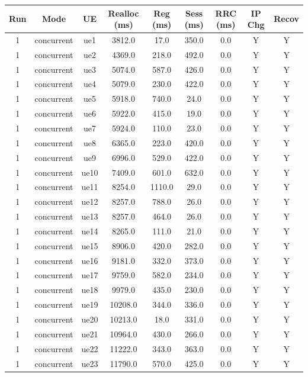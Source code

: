 \begin{table}[ht]
\centering
\begin{tabular}{|c|c|c|c|c|c|c|c|c|}
\hline
Run & Mode & UE & Realloc (ms) & Reg (ms) & Sess (ms) & RRC (ms) & IP Chg & Recov \\
\hline
1 & concurrent & ue1 & 3812.0 & 17.0 & 350.0 & 0.0 & Y & Y \\
1 & concurrent & ue2 & 4369.0 & 218.0 & 492.0 & 0.0 & Y & Y \\
1 & concurrent & ue3 & 5074.0 & 587.0 & 426.0 & 0.0 & Y & Y \\
1 & concurrent & ue4 & 5079.0 & 230.0 & 422.0 & 0.0 & Y & Y \\
1 & concurrent & ue5 & 5918.0 & 740.0 & 24.0 & 0.0 & Y & Y \\
1 & concurrent & ue6 & 5922.0 & 415.0 & 19.0 & 0.0 & Y & Y \\
1 & concurrent & ue7 & 5924.0 & 110.0 & 23.0 & 0.0 & Y & Y \\
1 & concurrent & ue8 & 6365.0 & 223.0 & 420.0 & 0.0 & Y & Y \\
1 & concurrent & ue9 & 6996.0 & 529.0 & 422.0 & 0.0 & Y & Y \\
1 & concurrent & ue10 & 7409.0 & 601.0 & 632.0 & 0.0 & Y & Y \\
1 & concurrent & ue11 & 8254.0 & 1110.0 & 29.0 & 0.0 & Y & Y \\
1 & concurrent & ue12 & 8257.0 & 788.0 & 26.0 & 0.0 & Y & Y \\
1 & concurrent & ue13 & 8257.0 & 464.0 & 26.0 & 0.0 & Y & Y \\
1 & concurrent & ue14 & 8265.0 & 111.0 & 21.0 & 0.0 & Y & Y \\
1 & concurrent & ue15 & 8906.0 & 420.0 & 282.0 & 0.0 & Y & Y \\
1 & concurrent & ue16 & 9181.0 & 332.0 & 373.0 & 0.0 & Y & Y \\
1 & concurrent & ue17 & 9759.0 & 582.0 & 234.0 & 0.0 & Y & Y \\
1 & concurrent & ue18 & 9979.0 & 435.0 & 230.0 & 0.0 & Y & Y \\
1 & concurrent & ue19 & 10208.0 & 344.0 & 336.0 & 0.0 & Y & Y \\
1 & concurrent & ue20 & 10213.0 & 18.0 & 331.0 & 0.0 & Y & Y \\
1 & concurrent & ue21 & 10964.0 & 430.0 & 266.0 & 0.0 & Y & Y \\
1 & concurrent & ue22 & 11222.0 & 343.0 & 363.0 & 0.0 & Y & Y \\
1 & concurrent & ue23 & 11790.0 & 570.0 & 425.0 & 0.0 & Y & Y \\

\end{tabular}
\end{table}
